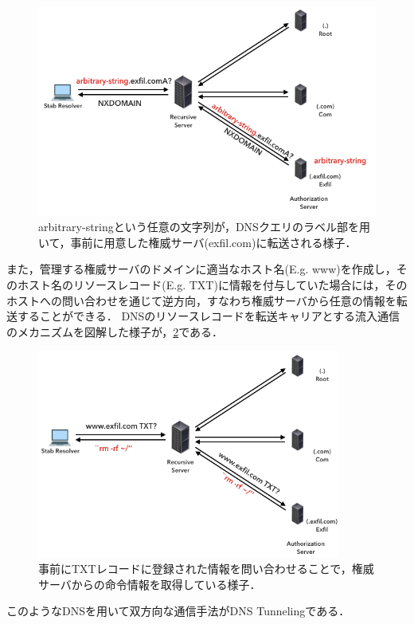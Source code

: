 \begin{figure}[h]
 \centering
 \includegraphics[width=12.0cm]{figure/dns-exfiltration.png}
 \caption{arbitrary-stringという任意の文字列が，DNSクエリのラベル部を用いて，事前に用意した権威サーバ(exfil.com)に転送される様子．}
 \label{fig:dns-exfiltration}
\end{figure}

また，管理する権威サーバのドメインに適当なホスト名(E.g. www)を作成し，そのホスト名のリソースレコード(E.g. TXT)に情報を付与していた場合には，そのホストへの問い合わせを通じて逆方向，すなわち権威サーバから任意の情報を転送することができる．
DNSのリソースレコードを転送キャリアとする流入通信のメカニズムを図解した様子が，\ref{fig:dns-tunneling}である．

\begin{figure}[h]
 \centering
 \includegraphics[width=10.0cm]{figure/dns-tunneling.png}
 \caption{事前にTXTレコードに登録された情報を問い合わせることで，権威サーバからの命令情報を取得している様子．}
 \label{fig:dns-tunneling}
\end{figure}

このようなDNSを用いて双方向な通信手法がDNS Tunnelingである．

